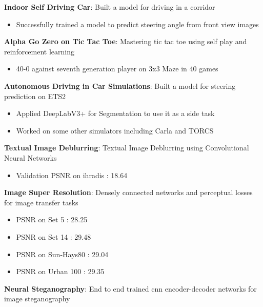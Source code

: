 \documentclass[letterpaper,11pt]{article}
\newcommand{\resumeItem}[2]{
  \item\small{
    \textbf{#1}{: #2 \vspace{-2pt}}
  }
}
\newcommand{\resumeSubItem}[2]{\resumeItem{#1}{#2}\vspace{-4pt}}
\begin{document}
      \resumeSubItem{Indoor Self Driving Car}
      {Built a model for driving in a corridor}
      \begin{itemize}
      \item Successfully trained a model to predict steering angle from front view images    
			\end{itemize}
    \resumeSubItem{Alpha Go Zero on Tic Tac Toe}
      {Mastering tic tac toe using self play and reinforcement learning}
      \begin{itemize}
      \item 40-0 against seventh generation player on 3x3 Maze in 40
games
			\end{itemize}
      
           \resumeSubItem{Autonomous Driving in Car Simulations}
      {Built a model for steering prediction on ETS2}
      \begin{itemize}
\item Applied DeepLabV3+ for Segmentation to use it as a side task
\item Worked on some other simulators including Carla and TORCS
			\end{itemize}
      
      


    \resumeSubItem{Textual Image Deblurring}
      {Textual Image Deblurring using Convolutional Neural Networks}

 \begin{itemize}
      \item Validation PSNR on ihradis : 18.64
			\end{itemize}
    \resumeSubItem{Image Super Resolution}
      {Densely connected networks and perceptual losses for
image transfer tasks}






 \begin{itemize}
      \item PSNR on Set 5 : 28.25
      \item PSNR on Set 14 : 29.48
      \item PSNR on Sun-Hays80 : 29.04
      \item PSNR on Urban 100 : 29.35
			\end{itemize}
			
			 \resumeSubItem{Neural Steganography}
      {End to end trained cnn encoder-decoder networks for
image steganography}
\end{document}
